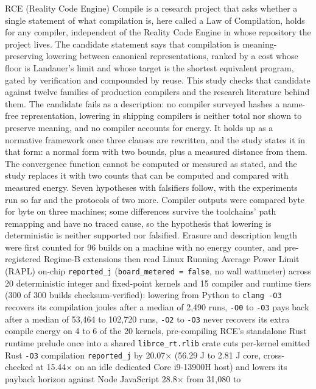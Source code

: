 \documentclass[10pt,letterpaper]{article}
\begin{document}
RCE (Reality Code Engine) Compile is a research project that asks
whether a single statement of what compilation is, here called a Law of
Compilation, holds for any compiler, independent of the Reality Code
Engine in whose repository the project lives. The candidate statement
says that compilation is meaning-preserving lowering between canonical
representations, ranked by a cost whose floor is Landauer's limit and
whose target is the shortest equivalent program, gated by verification
and compounded by reuse. This study checks that candidate against twelve
families of production compilers and the research literature behind
them. The candidate fails as a description: no compiler surveyed hashes
a name-free representation, lowering in shipping compilers is neither
total nor shown to preserve meaning, and no compiler accounts for
energy. It holds up as a normative framework once three clauses are
rewritten, and the study states it in that form: a normal form with two
bounds, plus a measured distance from them. The convergence function
cannot be computed or measured as stated, and the study replaces it with
two counts that can be computed and compared with measured energy. Seven
hypotheses with falsifiers follow, with the experiments run so far and
the protocols of two more. Compiler outputs were compared byte for byte
on three machines; some differences survive the toolchains' path
remapping and have no traced cause, so the hypothesis that lowering is
deterministic is neither supported nor falsified. Erasure and
description length were first counted for 96 builds on a machine with no
energy counter, and pre-registered Regime-B extensions then read Linux
Running Average Power Limit (RAPL) on-chip \texttt{reported\_\allowbreak{}j}
(\texttt{board\_\allowbreak{}metered\ =\ false}, no wall wattmeter) across 20
deterministic integer and fixed-point kernels and 15 compiler and
runtime tiers (300 of 300 builds checksum-verified): lowering from
Python to \texttt{clang\ -\allowbreak{}O3} recovers its compilation joules after a
median of 2,490 runs, \texttt{-O0} to \texttt{-O3} pays back after a
median of 53,464 to 102,720 runs, \texttt{-O2} to \texttt{-O3} never
recovers its extra compile energy on 4 to 6 of the 20 kernels,
pre-compiling RCE's standalone Rust runtime prelude once into a shared
\texttt{librce\_\allowbreak{}rt.\allowbreak{}rlib} crate cuts per-kernel emitted Rust \texttt{-O3}
compilation \texttt{reported\_\allowbreak{}j} by 20.07× (56.29 J to 2.81 J core,
cross-checked at 15.44× on an idle dedicated Core i9-13900H host) and
lowers its payback horizon against Node JavaScript 28.8× from 31,080 to
\end{document}
